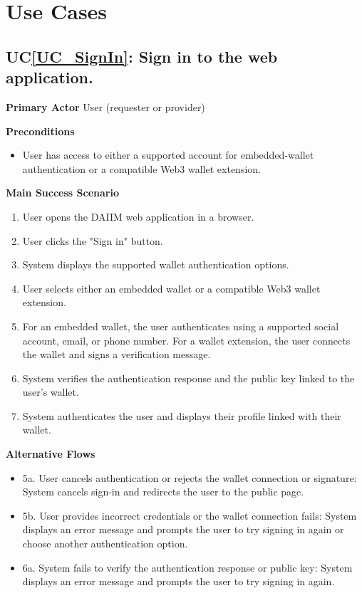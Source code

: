 \documentclass[12pt]{article}
\newcounter{ucnum} %
\newcommand{\ucref}[1]{UC\ref{#1}}
\begin{document}
\section{Use Cases}

 \label{UC_SignIn}
\subsection{\ucref{UC_SignIn}: Sign in to the web application.}

\textbf{Primary Actor}
User (requester or provider)

\textbf{Preconditions}
\begin{itemize}
\item User has access to either a supported account for embedded-wallet authentication or a compatible Web3 wallet extension.
\end{itemize}

\textbf{Main Success Scenario}
\begin{enumerate}
\item User opens the DAIIM web application in a browser.
\item User clicks the "Sign in" button.
\item System displays the supported wallet authentication options.
\item User selects either an embedded wallet or a compatible Web3 wallet extension.
\item For an embedded wallet, the user authenticates using a supported social account, email, or phone number. For a wallet extension, the user connects the wallet and signs a verification message.
\item System verifies the authentication response and the public key linked to the user's wallet.
\item System authenticates the user and displays their profile linked with their wallet.

\end{enumerate}

\textbf{Alternative Flows}
\begin{itemize}
\item 5a. User cancels authentication or rejects the wallet connection or signature: System cancels sign-in and redirects the user to the public page.
\item 5b. User provides incorrect credentials or the wallet connection fails: System displays an error message and prompts the user to try signing in again or choose another authentication option.
\item 6a. System fails to verify the authentication response or public key: System displays an error message and prompts the user to try signing in again.
\end{itemize}
\end{document}
